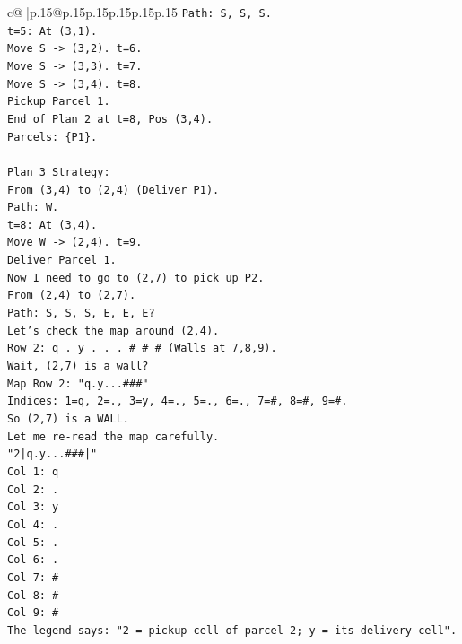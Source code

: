 \documentclass{article}
\begin{document}
{\begin{supertabular}{c@{$\;$}|p{.15\linewidth}@{}p{.15\linewidth}p{.15\linewidth}p{.15\linewidth}p{.15\linewidth}p{.15\linewidth}}
{{{\texttt{Path: S, S, S.} \\
\texttt{t=5: At (3,1).} \\
\texttt{Move S {-}> (3,2). t=6.} \\
\texttt{Move S {-}> (3,3). t=7.} \\
\texttt{Move S {-}> (3,4). t=8.} \\
\texttt{Pickup Parcel 1.} \\
\texttt{End of Plan 2 at t=8, Pos (3,4).} \\
\texttt{Parcels: \{P1\}.} \\
\\ 
\texttt{Plan 3 Strategy:} \\
\texttt{From (3,4) to (2,4) (Deliver P1).} \\
\texttt{Path: W.} \\
\texttt{t=8: At (3,4).} \\
\texttt{Move W {-}> (2,4). t=9.} \\
\texttt{Deliver Parcel 1.} \\
\texttt{Now I need to go to (2,7) to pick up P2.} \\
\texttt{From (2,4) to (2,7).} \\
\texttt{Path: S, S, S, E, E, E?} \\
\texttt{Let's check the map around (2,4).} \\
\texttt{Row 2: q . y . . . \# \# \# (Walls at 7,8,9).} \\
\texttt{Wait, (2,7) is a wall?} \\
\texttt{Map Row 2: "q.y...\#\#\#"} \\
\texttt{Indices: 1=q, 2=., 3=y, 4=., 5=., 6=., 7=\#, 8=\#, 9=\#.} \\
\texttt{So (2,7) is a WALL.} \\
\texttt{Let me re{-}read the map carefully.} \\
\texttt{"2|q.y...\#\#\#|"} \\
\texttt{Col 1: q} \\
\texttt{Col 2: .} \\
\texttt{Col 3: y} \\
\texttt{Col 4: .} \\
\texttt{Col 5: .} \\
\texttt{Col 6: .} \\
\texttt{Col 7: \#} \\
\texttt{Col 8: \#} \\
\texttt{Col 9: \#} \\
\texttt{The legend says: "2 = pickup cell of parcel 2; y = its delivery cell".} \\
}}}
\end{supertabular}}
\end{document}
